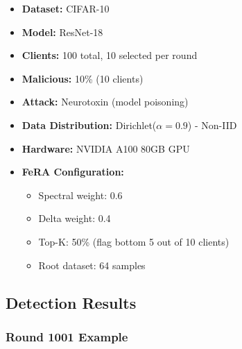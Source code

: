 \documentclass[11pt,a4paper]{article}
\begin{document}
\begin{itemize}
    \item \textbf{Dataset:} CIFAR-10
    \item \textbf{Model:} ResNet-18
    \item \textbf{Clients:} 100 total, 10 selected per round
    \item \textbf{Malicious:} 10\% (10 clients)
    \item \textbf{Attack:} Neurotoxin (model poisoning)
    \item \textbf{Data Distribution:} Dirichlet($\alpha=0.9$) - Non-IID
    \item \textbf{Hardware:} NVIDIA A100 80GB GPU
    \item \textbf{FeRA Configuration:}
    \begin{itemize}
        \item Spectral weight: 0.6
        \item Delta weight: 0.4
        \item Top-K: 50\% (flag bottom 5 out of 10 clients)
        \item Root dataset: 64 samples
    \end{itemize}
\end{itemize}

\subsection{Detection Results}

\subsubsection{Round 1001 Example}
\end{document}
